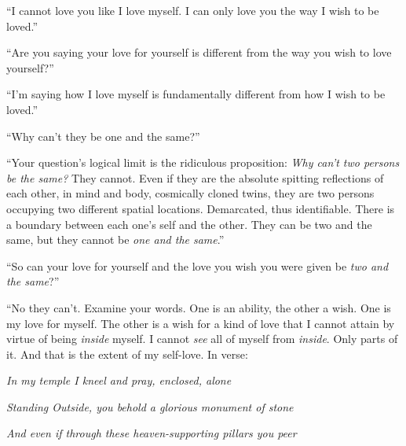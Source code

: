 \documentclass{article}
\begin{document}
\newline

``I cannot love you like I love myself. I can only love you the way
I wish to be loved.''
\newline
\newline

``Are you saying your love for yourself is different from the way you
wish to love yourself?''
\newline
\newline

``I'm saying how I love myself is fundamentally different from how
I wish to be loved.''
\newline
\newline

``Why can't they be one and the same?'' 
\newline
\newline

``Your question's logical limit is the ridiculous proposition:
\textit{Why can't two persons be the same?} They cannot. Even if they
are the absolute spitting reflections of each other, in mind and body,
cosmically cloned twins, they are two persons occupying two different
spatial locations. Demarcated, thus identifiable. There is a boundary
between each one's self and the other. They can be two and the same, but
they cannot be \textit{one and the same}.'' \newline \newline

``So can your love for yourself and the love you wish you were given be
\textit{two and the same}?'' \newline
\newline

``No they can't. Examine your words. One is an ability, the other
a wish. One is my love for myself. The other is a wish for a kind of
love that I cannot attain by virtue of being \textit{inside} myself.
I cannot \textit{see} all of myself from \textit{inside}. Only parts of
it. And that is the extent of my self-love. In verse:\newline\newline

\textit{In my temple I kneel and pray, enclosed, alone}\newline

\textit{Standing Outside, you behold a glorious monument of
stone}\newline 

\textit{And even if through these heaven-supporting pillars you peer}
\newline 
\end{document}
